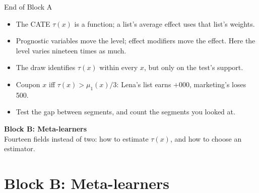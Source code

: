 \documentclass[aspectratio=169, 11pt, handout]{beamer}
\begin{document}
\begin{frame}{End of Block A}

\begin{itemize}
  \item The CATE $\tau(x)$ is a function; a list's average effect uses that list's weights.
  \item Prognostic variables move the level; effect modifiers move the effect. Here the level varies nineteen times as much.
  \item The draw identifies $\tau(x)$ within every $x$, but only on the test's support.
  \item Coupon $x$ iff $\tau(x) > \mu_1(x)/3$: Lena's list earns $+$000, marketing's loses 500.
  \item Test the gap between segments, and count the segments you looked at.
\end{itemize}

\vfill

\begin{center}
\Large \textbf{Block B: Meta-learners}\\[0.4em]
\normalsize Fourteen fields instead of two: how to estimate $\tau(x)$, and how to choose an estimator.
\end{center}
\vfill
\end{frame}

\section{Block B: Meta-learners}
\end{document}
